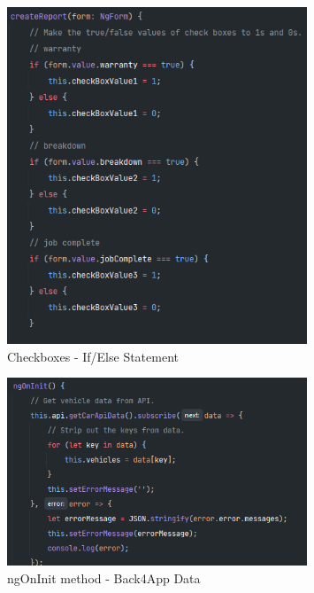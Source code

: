 \begin{figure}[H]
    \centering
    \caption{Checkboxes - If/Else Statement}
    \label{image:createReportIf-Else}
    \includegraphics[width=0.8\textwidth]{images/repota/report_pages/create_1.png}
\end{figure}

\begin{figure}[H]
    \centering
    \caption{ngOnInit method - Back4App Data}
    \label{image:ngOnInitBack4App}
    \includegraphics[width=0.8\textwidth]{images/repota/report_pages/back4app.png}
\end{figure}

